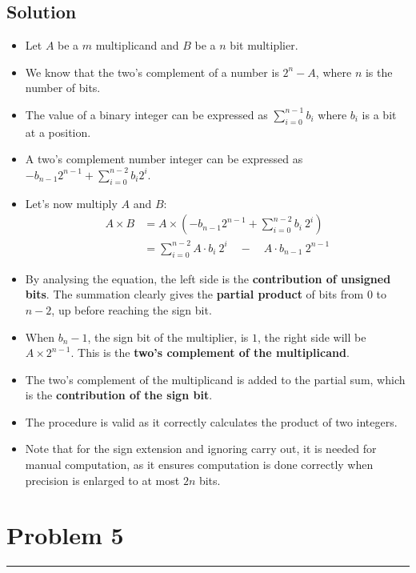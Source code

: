 \documentclass{article}
\begin{document}
\subsection*{Solution}

\begin{itemize}
    \item Let $A$ be a $m$ multiplicand and $B$ be a $n$ bit multiplier.
    \item We know that the two's complement of a number is $2^n-A$, where $n$ is the number of bits.
    \item The value of a binary integer can be expressed as $\sum_{i=0}^{n-1} b_i$ where $b_i$ is a bit at a position.
    \item A two's complement number integer can be expressed as $-b_{n-1}2^{n-1}+\sum_{i=0}^{n-2}b_i2^i$.
    \item Let's now multiply $A$ and $B$: \[\begin{aligned}
                  A\times B & =A\times(-b_{n-1}2^{n-1}+\sum_{i=0}^{n-2}b_i\:2^i)                  \\
                            & =\sum_{i=0}^{n-2}A\cdot b_i\:2^i\quad-\quad A\cdot b_{n-1}\:2^{n-1}
              \end{aligned}\]
    \item By analysing the equation, the left side is the \textbf{contribution of unsigned bits}. The summation clearly gives the \textbf{partial product} of bits from $0$ to $n-2$, up before reaching the sign bit.
    \item When $b_n-1$, the sign bit of the multiplier, is $1$, the right side will be $A \times 2^{n-1}$. This is the \textbf{two's complement of the multiplicand}.
    \item The two's complement of the multiplicand is added to the partial sum, which is the \textbf{contribution of the sign bit}.
    \item The procedure is valid as it correctly calculates the product of two integers.
    \item Note that for the sign extension and ignoring carry out, it is needed for manual computation, as it ensures computation is done correctly when precision is enlarged to at most $2n$ bits.
\end{itemize}

\section*{Problem 5}
\hrule
\vspace{0.5cm}
\end{document}
